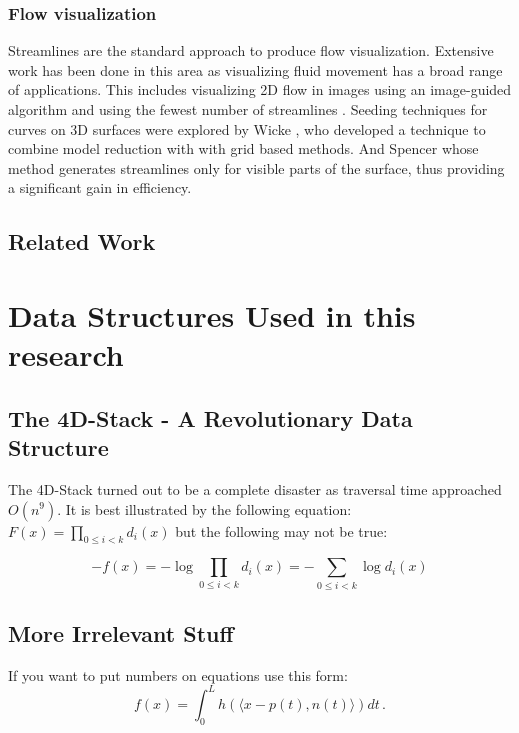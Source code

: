 \documentclass[11pt]{report}
\begin{document}
\subsection{Flow visualization}

Streamlines are the standard approach to produce flow visualization.
Extensive work has been done in this area as visualizing fluid movement has a broad range of applications.
This includes visualizing 2D flow in images using an image-guided algorithm \cite{Turk1996} and using the fewest number of streamlines \cite{Li2008}.
Seeding techniques for curves on 3D surfaces were explored by Wicke \cite{Wicke2009}, who developed a technique to combine model reduction with with grid based methods.
And Spencer \cite{Spencer2009} whose method generates streamlines only for visible parts of the surface, thus providing a significant gain in efficiency.

\section{Related Work}


\chapter{Data Structures Used in this research}
\section{The 4D-Stack - A Revolutionary Data Structure}
The 4D-Stack turned out to be a complete disaster as traversal time approached $O(n^9).$
It is best illustrated by the following equation: $F(x) = \prod_{0\leq i<k}d_i(x)$
but the following may not be true:

\[
-f(x) = - \log \prod_{0\leq i<k}d_i(x) = - \sum_{0\leq i<k} \log d_i(x)
\]


\section{More Irrelevant Stuff}
If you want to put numbers on equations use this form:
\begin{equation}
\label{integralrep}
f(x)=\int_0^L h( \langle x-p(t),n(t) \rangle ) dt\,.
\end{equation}
\end{document}
